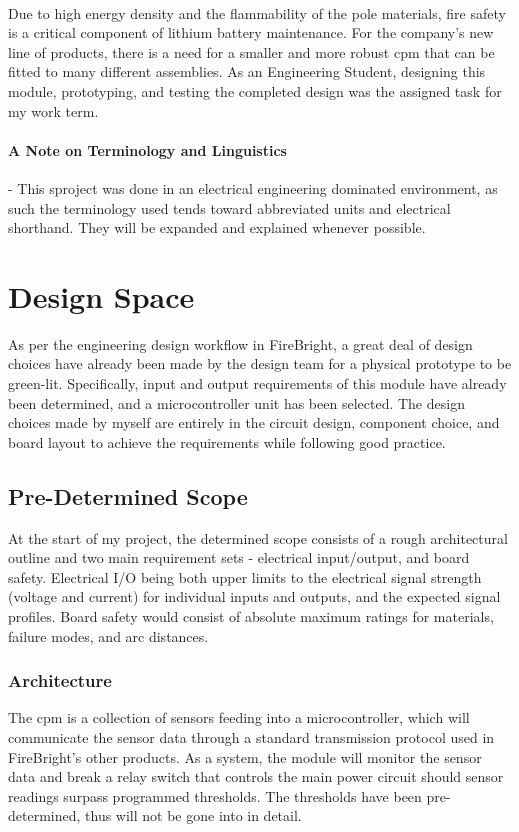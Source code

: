 \documentclass[12pt]{article}
\begin{document}
	\paragraph{}
	Due to high energy density and the flammability of the pole materials, fire safety is a critical component of lithium battery maintenance. For the company's new line of products, there is a need for a smaller and more robust \acrfull{cpm} that can be fitted to many different assemblies. As an Engineering Student, designing this module, prototyping, and testing the completed design was the assigned task for my work term.

    \paragraph{A Note on Terminology and Linguistics} - This sproject was done in an electrical engineering dominated environment, as such the terminology used tends toward abbreviated units and electrical shorthand. They will be expanded and explained whenever possible.
  
	\section{Design Space}
	As per the engineering design workflow in FireBright, a great deal of design choices have already been made by the design team for a physical prototype to be green-lit. Specifically, input and output requirements of this module have already been determined, and a microcontroller unit has been selected. The design choices made by myself are entirely in the circuit design, component choice, and board layout to achieve the requirements while following good practice.
	
	\subsection{Pre-Determined Scope\label{sec:pre-determined-scope}}
	At the start of my project, the determined scope consists of a rough architectural outline and two main requirement sets - electrical input/output, and board safety. Electrical I/O being both upper limits to the electrical signal strength (voltage and current) for individual inputs and outputs, and the expected signal profiles. Board safety would consist of absolute maximum ratings for materials, failure modes, and arc distances.
	
    \subsubsection{Architecture\label{sec:architecture}}
    The \acrshort{cpm} is a collection of sensors feeding into a microcontroller, which will communicate the sensor data through a standard transmission protocol used in FireBright's other products. As a system, the module will monitor the sensor data and break a relay switch that controls the main power circuit should sensor readings surpass programmed thresholds. The thresholds have been pre-determined, thus will not be gone into in detail.
\end{document}

